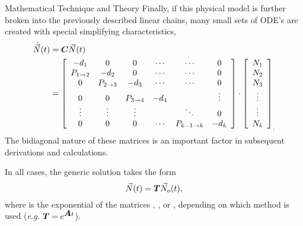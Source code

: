 \begin{chapter}{Mathematical Technique and Theory}
Finally, if this physical model is further broken into the previously
described linear chains, many small sets of ODE's are created with
special simplifying characteristics,
\begin{equation}
  \begin{split}
    \dot{\vec{N}}(t) &= \mbox{\boldmath $C$}\vec{N}(t)\\
    &= \left [
      \begin{array}{cccccc}
        -d_1 & 0 & 0 & \cdots & \cdots & 0 \\
        P_{1\rightarrow 2} & -d_2 & 0 & \cdots & \cdots & 0\\
        0 & P_{2\rightarrow 3} & -d_3 & \cdots & \cdots & 0 \\
        0 & 0 & P_{3\rightarrow 4} & -d_4 &  & \vdots\\
        \vdots & \vdots & \vdots & & \ddots & 0\\
        0 & 0 & 0 & \cdots & P_{k-1\rightarrow k} & -d_k
      \end{array} \right ] \cdot \left [
      \begin{array}{c}
        N_1 \\ N_2 \\ N_3 \\ \vdots \\ \vdots \\ N_k
      \end{array} \right ]_.\label{eq:math.intro.chains}
  \end{split}
\end{equation}
The bidiagonal nature of these matrices is an important factor in
subsequent derivations and calculations.

In all cases, the generic solution takes the form
\begin{equation}
  \vec{N}(t) = \mbox{\boldmath $T$}\vec{N}_o(t),\label{eq:math.intro.main}
\end{equation}
where  is the exponential of the matrices , , or
, depending on which method is used (\textsl{e.g.} $\mbox{\boldmath $T$} =
e^{\mbox{\boldmath $A$} t}$).


\end{chapter}

